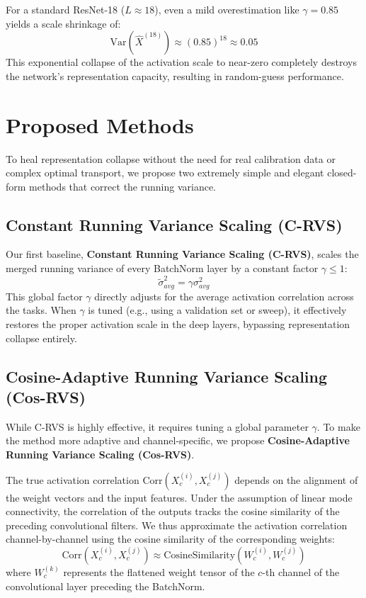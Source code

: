 \documentclass{article}
\theoremstyle{plain}
\theoremstyle{definition}
\theoremstyle{remark}
\begin{document}
For a standard ResNet-18 ($L \approx 18$), even a mild overestimation like $\gamma=0.85$ yields a scale shrinkage of:
\begin{equation}
    \text{Var}(\hat{X}^{(18)}) \approx (0.85)^{18} \approx 0.05
\end{equation}
This exponential collapse of the activation scale to near-zero completely destroys the network's representation capacity, resulting in random-guess performance.

\section{Proposed Methods}
\label{sec:methods}

To heal representation collapse without the need for real calibration data or complex optimal transport, we propose two extremely simple and elegant closed-form methods that correct the running variance.

\subsection{Constant Running Variance Scaling (C-RVS)}

Our first baseline, \textbf{Constant Running Variance Scaling (C-RVS)}, scales the merged running variance of every BatchNorm layer by a constant factor $\gamma \le 1$:
\begin{equation}
    \tilde{\sigma}^2_{avg} = \gamma \sigma^2_{avg}
\label{eq:crvs}
\end{equation}
This global factor $\gamma$ directly adjusts for the average activation correlation across the tasks. When $\gamma$ is tuned (e.g., using a validation set or sweep), it effectively restores the proper activation scale in the deep layers, bypassing representation collapse entirely.

\subsection{Cosine-Adaptive Running Variance Scaling (Cos-RVS)}

While C-RVS is highly effective, it requires tuning a global parameter $\gamma$. To make the method more adaptive and channel-specific, we propose \textbf{Cosine-Adaptive Running Variance Scaling (Cos-RVS)}.

The true activation correlation $\text{Corr}(X^{(i)}_c, X^{(j)}_c)$ depends on the alignment of the weight vectors and the input features. Under the assumption of linear mode connectivity, the correlation of the outputs tracks the cosine similarity of the preceding convolutional filters. We thus approximate the activation correlation channel-by-channel using the cosine similarity of the corresponding weights:
\begin{equation}
    \text{Corr}(X^{(i)}_c, X^{(j)}_c) \approx \text{CosineSimilarity}(W^{(i)}_c, W^{(j)}_c)
\label{eq:cos_sim_approx}
\end{equation}
where $W^{(k)}_c$ represents the flattened weight tensor of the $c$-th channel of the convolutional layer preceding the BatchNorm.
\end{document}
